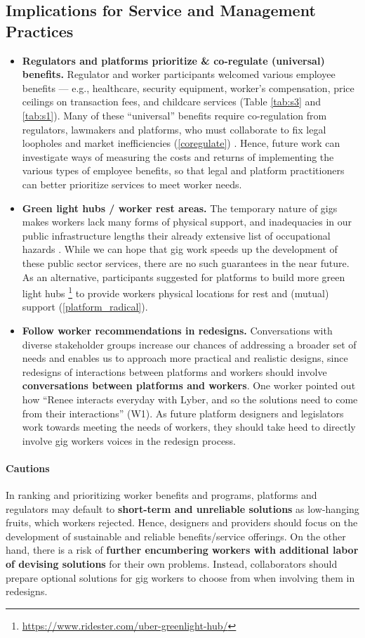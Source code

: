 \subsection{Implications for Service and Management Practices}
\begin{itemize}
    \item \textbf{Regulators and platforms prioritize \& co-regulate (universal) benefits.} Regulator and worker participants welcomed various employee benefits --- e.g., healthcare, security equipment, worker's compensation, price ceilings on transaction fees, and childcare services (Table \ref{tab:s3} and \ref{tab:s1}). Many of these ``universal'' benefits require co-regulation from regulators, lawmakers and platforms, who must collaborate to fix legal loopholes and market inefficiencies (\ref{coregulate}) \cite{cannon2014framework}. Hence, future work can investigate ways of measuring the costs and returns of implementing the various types of employee benefits, so that legal and platform practitioners can better prioritize services to meet worker needs.
    \item \textbf{Green light hubs / worker rest areas. }The temporary nature of gigs makes workers lack many forms of physical support, and inadequacies in our public infrastructure lengths their already extensive list of occupational hazards \cite{tran2017gig}. While we can hope that gig work speeds up the development of these public sector services, there are no such guarantees in the near future. As an alternative, participants suggested for platforms to build more green light hubs \footnote{\url{https://www.ridester.com/uber-greenlight-hub/}} to provide workers physical locations for rest and (mutual) support (\ref{platform_radical}).
    \item \textbf{Follow worker recommendations in redesigns.} Conversations with diverse stakeholder groups increase our chances of addressing a broader set of needs and enables us to approach more practical and realistic designs, since redesigns of interactions between platforms and workers should involve \textbf{conversations between platforms and workers}. One worker pointed out how ``Renee interacts everyday with Lyber, and so the solutions need to come from their interactions'' (W1). As future platform designers and legislators work towards meeting the needs of workers, they should take heed to directly involve gig workers voices in the redesign process.

\end{itemize}

\paragraph{Cautions}
In ranking and prioritizing worker benefits and programs, platforms and regulators may default to \textbf{short-term and unreliable solutions} as low-hanging fruits, which workers rejected. Hence, designers and providers should focus on the development of sustainable and reliable benefits/service offerings. 
On the other hand, there is a risk of \textbf{further encumbering workers with additional labor of devising solutions} for their own problems. Instead, collaborators should prepare optional solutions for gig workers to choose from when involving them in redesigns.
